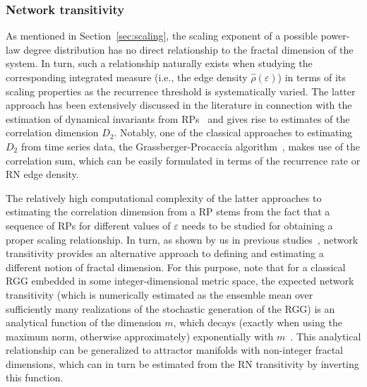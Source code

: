 \documentclass[graybox]{svmult}
\begin{document}
\subsubsection{Network transitivity}\label{sec:transitivity}

As mentioned in Section~\ref{sec:scaling}, the scaling exponent of a possible power-law degree distribution has no direct relationship to the fractal dimension of the system. In turn, such a relationship naturally exists when studying the corresponding integrated measure (i.e., the edge density $\hat{\rho}(\varepsilon)$) in terms of its scaling properties as the recurrence threshold is systematically varied. The latter approach has been extensively discussed in the literature in connection with the estimation of dynamical invariants from RPs~\cite{Faure1998,thiel2004a} and gives rise to estimates of the correlation dimension $D_2$. Notably, one of the classical approaches to estimating $D_2$ from time series data, the Grassberger-Procaccia algorithm~\cite{Grassberger1983PLA,Grassberger1983PRL}, makes use of the correlation sum, which can be easily formulated in terms of the recurrence rate or RN edge density.

The relatively high computational complexity of the latter approaches to estimating the correlation dimension from a RP stems from the fact that a sequence of RPs for different values of $\varepsilon$ needs to be studied for obtaining a proper scaling relationship. In turn, as shown by us in previous studies~\cite{Donner2011EPJB}, network transitivity provides an alternative approach to defining and estimating a different notion of fractal dimension. For this purpose, note that for a classical RGG embedded in some integer-dimensional metric space, the expected network transitivity (which is numerically estimated as the ensemble mean over sufficiently many realizations of the stochastic generation of the RGG) is an analytical function of the dimension $m$, which decays (exactly when using the maximum norm, otherwise approximately) exponentially with $m$~\cite{Dall2002}. This analytical relationship can be generalized to attractor manifolds with non-integer fractal dimensions, which can in turn be estimated from the RN transitivity by inverting this function.
\end{document}
